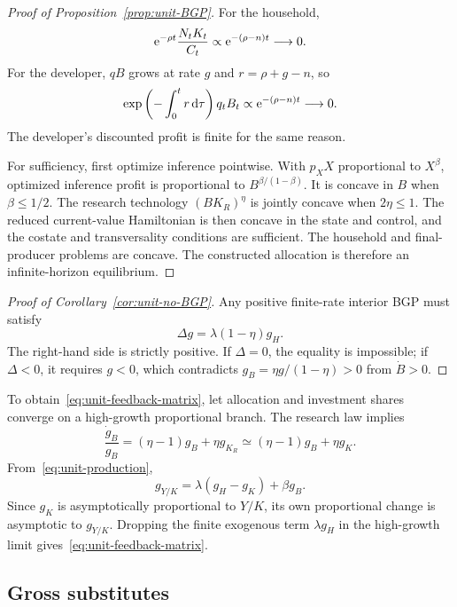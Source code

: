 \begin{proof}[Proof of Proposition~\ref{prop:unit-BGP}]
For the household,
\[
 \mathrm{e}^{-\rho t}\frac{N_tK_t}{C_t}
 \propto\mathrm{e}^{-(\rho-n)t}\longrightarrow0.
\]
For the developer, $qB$ grows at rate $g$ and
$r=\rho+g-n$, so
\[
 \exp\left(-\int_0^t r\,\mathrm{d}\tau\right)q_tB_t
 \propto\mathrm{e}^{-(\rho-n)t}\longrightarrow0.
\]
The developer's discounted profit is finite for the same reason.

For sufficiency, first optimize inference pointwise. With
$p_XX$ proportional to $X^\beta$, optimized inference profit is proportional to
$B^{\beta/(1-\beta)}$. It is concave in $B$ when $\beta\leq1/2$.
The research technology $(BK_R)^\eta$ is jointly concave when
$2\eta\leq1$. The reduced current-value Hamiltonian is then concave in the state and control, and the costate and transversality conditions are sufficient. The household and final-producer problems are concave. The constructed allocation is therefore an infinite-horizon equilibrium.
\end{proof}

\begin{proof}[Proof of Corollary~\ref{cor:unit-no-BGP}]
Any positive finite-rate interior BGP must satisfy
\[
 \Delta g=\lambda(1-\eta)g_H.
\]
The right-hand side is strictly positive. If $\Delta=0$, the equality is impossible; if $\Delta<0$, it requires $g<0$, which contradicts
$g_B=\eta g/(1-\eta)>0$ from $\dot B>0$.
\end{proof}

To obtain~\eqref{eq:unit-feedback-matrix}, let allocation and investment shares converge on a high-growth proportional branch. The research law implies
\[
 \frac{\dot g_B}{g_B}
 =(\eta-1)g_B+\eta g_{K_R}
 \simeq(\eta-1)g_B+\eta g_K.
\]
From~\eqref{eq:unit-production},
\[
 g_{Y/K}
 =\lambda(g_H-g_K)+\beta g_B.
\]
Since $g_K$ is asymptotically proportional to $Y/K$, its own proportional change is asymptotic to $g_{Y/K}$. Dropping the finite exogenous term $\lambda g_H$ in the high-growth limit gives~\eqref{eq:unit-feedback-matrix}.

\subsection{Gross substitutes}

